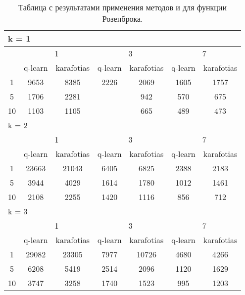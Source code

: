 \begin{table}
\centering
  \begin{tabular}{|*7{c|}}
    \hline
    \multicolumn{7}{|l|}{k = 1} \\
    \hline
    \multirow{2}{*}{\diagbox{$\mu$}{$\lambda$}} & \multicolumn{2}{c|}{1} & \multicolumn{2}{c|}{3} & \multicolumn{2}{c|}{7} \\
    \cline{2-7}
    & q-learn & karafotias & q-learn & karafotias & q-learn & karafotias \\
    \hline
    1 & 9653 & 8385 & 2226& 2069& 1605 & 1757 \\
    \hline
    5 & 1706 & 2281& \cellcolor{olive}{894} & 942 & 570 & 675 \\
    \hline
    10 & 1103 & 1105& \cellcolor{olive}{604} & 665 & 489 & 473 \\
    \hline
    \multicolumn{7}{|l|}{k = 2} \\
    \hline
    \multirow{2}{*}{\diagbox{$\mu$}{$\lambda$}} & \multicolumn{2}{c|}{1} & \multicolumn{2}{c|}{3} & \multicolumn{2}{c|}{7} \\
    \cline{2-7}
    & q-learn & karafotias & q-learn & karafotias & q-learn & karafotias \\
    \hline
    1 & 23663 & 21043 & 6405 & 6825 & 2388 & 2183 \\
    \hline
    5 & 3944 & 4029 & 1614 & 1780 & 1012 & 1461 \\
    \hline
    10 & 2108 & 2255 & 1420 & 1116 & 856 & 712 \\
    \hline
    \multicolumn{7}{|l|}{k = 3} \\
    \hline
    \multirow{2}{*}{\diagbox{$\mu$}{$\lambda$}} & \multicolumn{2}{c|}{1} & \multicolumn{2}{c|}{3} & \multicolumn{2}{c|}{7} \\
    \cline{2-7}
    & q-learn & karafotias & q-learn & karafotias & q-learn & karafotias \\
    \hline
    1 & 29082 & 23305 & 7977 & 10726 & 4680 & 4266 \\
    \hline
    5 & 6208 & 5419 & 2514 & 2096 & 1120 & 1629 \\
    \hline
    10 & 3747 & 3258 & 1740 & 1523 & 995 & 1203 \\
    \hline
  \end{tabular}
  \captionsetup{justification=centering}
  \caption{Таблица с результатами применения методов  и  для функции Розенброка.}
  \label{q_rosenbrock_results}
\end{table}

